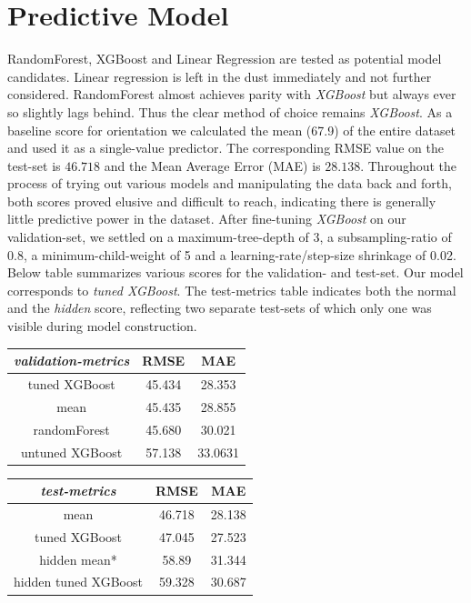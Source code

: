 \documentclass[11pt, oneside]{article}   	%
\begin{document}
\section{Predictive Model}
RandomForest, XGBoost and Linear Regression are tested as potential model candidates. Linear regression is left in the dust immediately and not further considered. RandomForest almost achieves parity with \textit{XGBoost} but always ever so slightly lags behind. Thus the clear method of choice remains \textit{XGBoost}.
\newline
\indent As a baseline score for orientation we calculated the mean (67.9) of the entire dataset and used it as a single-value predictor. The corresponding RMSE value on the test-set is $46.718$ and the Mean Average Error (MAE) is $28.138$. Throughout the process of trying out various models and manipulating the data back and forth, both scores proved elusive and difficult to reach, indicating there is generally little predictive power in the dataset. \newline
After fine-tuning \textit{XGBoost} on our validation-set, we settled on a maximum-tree-depth of 3, a subsampling-ratio of 0.8, a minimum-child-weight of 5 and a learning-rate/step-size shrinkage of 0.02.\newline
\indent Below table summarizes various scores for the validation- and test-set. Our model corresponds to \textit{tuned XGBoost}.
The test-metrics table indicates both the normal and the \textit{hidden} score, reflecting two separate test-sets of which only one was visible during model construction.
\newline
\begin{center}
\begin{tabular}{c | c c}
\textit{validation-metrics}&RMSE&MAE \\
\hline
tuned XGBoost&45.434&28.353\\
mean&45.435&28.855\\
randomForest&45.680&30.021\\
untuned XGBoost&57.138&33.0631
\end{tabular}
\end{center}

\begin{center}
\begin{tabular}{c | c c}
\textit{test-metrics}&RMSE&MAE \\
\hline
mean&46.718&28.138\\
tuned XGBoost&47.045&27.523\\
hidden mean*&58.89&31.344\\
hidden tuned XGBoost&59.328&30.687
\end{tabular}
\end{center}
\end{document}
